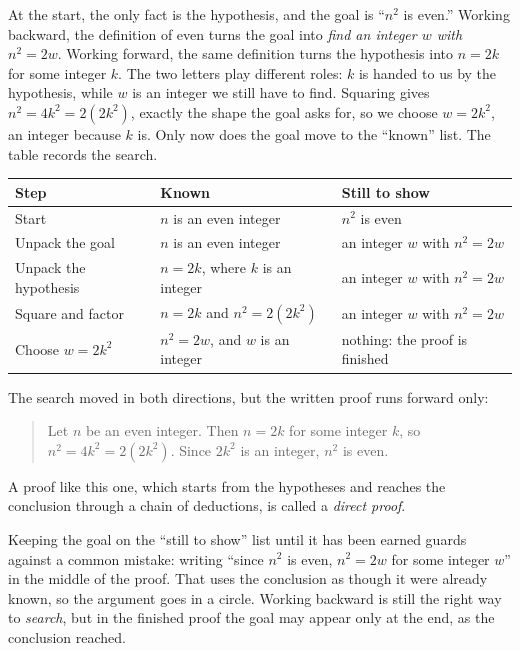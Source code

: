 At the start, the only fact is the hypothesis, and the goal is ``$n^2$ is even.'' Working backward, the definition of even turns the goal into \emph{find an integer $w$ with $n^2=2w$}. Working forward, the same definition turns the hypothesis into $n=2k$ for some integer $k$. The two letters play different roles: $k$ is handed to us by the hypothesis, while $w$ is an integer we still have to find. Squaring gives $n^2=4k^2=2(2k^2)$, exactly the shape the goal asks for, so we choose $w=2k^2$, an integer because $k$ is. Only now does the goal move to the ``known'' list. The table records the search.
\begin{center}
\begin{tabularx}{\linewidth}{@{}l>{\raggedright\arraybackslash}X>{\raggedright\arraybackslash}X@{}}
\toprule
Step & Known & Still to show\\
\midrule
Start & $n$ is an even integer & $n^2$ is even\\
Unpack the goal & $n$ is an even integer & an integer $w$ with $n^2=2w$\\
Unpack the hypothesis & $n=2k$, where $k$ is an integer & an integer $w$ with $n^2=2w$\\
Square and factor & $n=2k$ and $n^2=2(2k^2)$ & an integer $w$ with $n^2=2w$\\
Choose $w=2k^2$ & $n^2=2w$, and $w$ is an integer & nothing: the proof is finished\\
\bottomrule
\end{tabularx}
\end{center}
The search moved in both directions, but the written proof runs forward only:
\begin{quote}
Let $n$ be an even integer. Then $n=2k$ for some integer $k$, so $n^2=4k^2=2(2k^2)$. Since $2k^2$ is an integer, $n^2$ is even.
\end{quote}
A proof like this one, which starts from the hypotheses and reaches the conclusion through a chain of deductions, is called a \emph{direct proof}.

Keeping the goal on the ``still to show'' list until it has been earned guards against a common mistake: writing ``since $n^2$ is even, $n^2=2w$ for some integer $w$'' in the middle of the proof. That uses the conclusion as though it were already known, so the argument goes in a circle. Working backward is still the right way to \emph{search}, but in the finished proof the goal may appear only at the end, as the conclusion reached.


